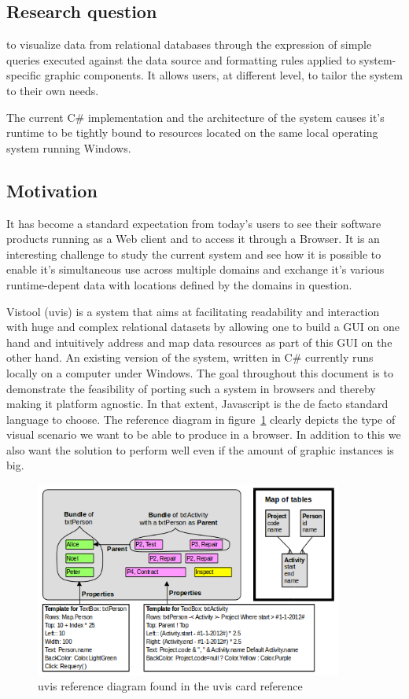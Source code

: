 \subsection{Research question}


to visualize data from relational databases through the expression of simple queries executed against the data source and formatting rules applied to system-specific graphic components. It allows users, at different level, to tailor the system to their own needs.

The current C\# implementation and the architecture of the system causes it's runtime to be tightly bound to resources located on the same local operating system running Windows.

\subsection{Motivation}

It has become a standard expectation from today's users to see their software products running as a Web client and to access it through a Browser. It is an interesting challenge to study the current system and see how it is possible to enable it's simultaneous use across multiple domains and exchange it's various runtime-depent data with locations defined by the domains in question.

\iffalse
Vistool (uvis) is a system that aims at facilitating readability and interaction with huge and complex relational datasets by allowing one to build a GUI on one hand and intuitively address and map data resources as part of this GUI on the other hand. An existing version of the system, written in C\# currently runs locally on a computer under Windows. The goal throughout this document is to demonstrate the feasibility of porting such a system in browsers and thereby making it platform agnostic. In that extent, Javascript is the de facto standard language to choose. The reference diagram in figure~\ref{img:refDiagram} clearly depicts the type of visual scenario we want to be able to produce in a browser. In addition to this we also want the solution to perform well even if the amount of graphic instances is big.

\begin{figure}
    \centering
    \includegraphics[width=0.9\textwidth]{images/uvisDiagram.png}
    \caption{uvis reference diagram found in the uvis card reference}
    \label{img:refDiagram}
\end{figure}

